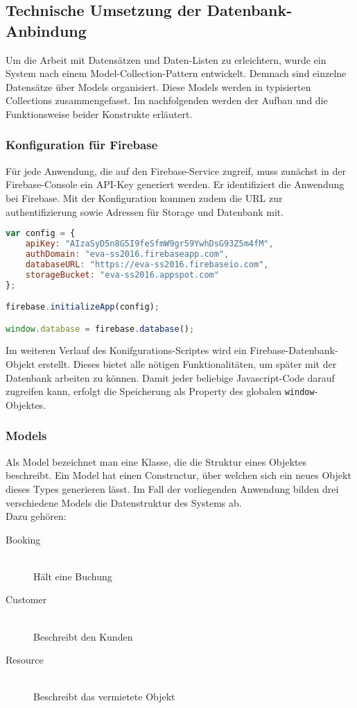 \subsection{Technische Umsetzung der Datenbank-Anbindung}
Um die Arbeit mit Datensätzen und Daten-Listen zu erleichtern, wurde ein System nach einem Model-Collection-Pattern entwickelt.
Demnach sind einzelne Datensätze über Models organisiert. Diese Models werden in typisierten Collections zusammengefasst.
Im nachfolgenden werden der Aufbau und die Funktionsweise beider Konstrukte erläutert.

\subsubsection{Konfiguration für Firebase}

Für jede Anwendung, die auf den Firebase-Service zugreif, muss zunächst in der Firebase-Console ein API-Key generiert werden. Er identifiziert die Anwendung bei Firebase.
Mit der Konfiguration kommen zudem die URL zur authentifizierung sowie Adressen für Storage und Datenbank mit.

\begin{lstlisting}[language=Javascript, label=code_APIConfig, caption=Konfiguration des Frontends]
var config = {
    apiKey: "AIzaSyD5n8G5I9feSfmW9gr59YwhDsG93Z5m4fM",
    authDomain: "eva-ss2016.firebaseapp.com",
    databaseURL: "https://eva-ss2016.firebaseio.com",
    storageBucket: "eva-ss2016.appspot.com"
};

firebase.initializeApp(config);

window.database = firebase.database();
\end{lstlisting}

Im weiteren Verlauf des Konifgurations-Scriptes wird ein Firebase-Datenbank-Objekt erstellt. Dieses bietet alle nötigen Funktionalitäten, um später mit der Datenbank arbeiten zu können.
Damit jeder beliebige Javascript-Code darauf zugreifen kann, erfolgt die Speicherung als Property des globalen \texttt{window}-Objektes.

\subsubsection{Models}

Als Model bezeichnet man eine Klasse, die die Struktur eines Objektes beschreibt. Ein Model hat einen Constructur, über welchen sich ein neues Objekt dieses Types generieren lässt.
Im Fall der vorliegenden Anwendung bilden drei verschiedene Models die Datenstruktur des Systems ab.\\
Dazu gehören:
\begin{description}
\item[Booking]\hfill \\
Hält eine Buchung
\item[Customer]\hfill \\
Beschreibt den Kunden
\item[Resource]\hfill \\
Beschreibt das vermietete Objekt
\end{description}

